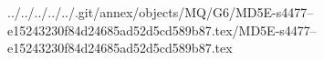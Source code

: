 ../../../../../.git/annex/objects/MQ/G6/MD5E-s4477--e15243230f84d24685ad52d5cd589b87.tex/MD5E-s4477--e15243230f84d24685ad52d5cd589b87.tex